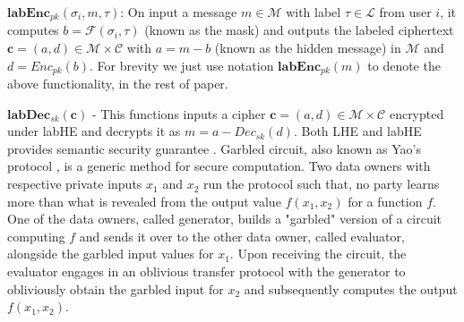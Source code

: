 \item $\textbf{labEnc}_{pk}(\sigma_i, m , \tau)$: On input a message $m \in \mathcal{M} $ with label $\tau \in \mathcal{L}$  from user $i$, it computes $b=\mathcal{F}(\sigma_i, \tau)$ (known as the mask) and outputs the labeled ciphertext $\mathbf{c}=(a,d) \in \mathcal{M} \times \mathcal{C}$ with $ a= m- b$  (known as the hidden message) in $\mathcal{M}$ and $d=Enc_{pk}(b)$. For brevity we just use notation $\textbf{labEnc}_{pk}(m)$ to denote the above functionality, in the rest of paper. 
\item $\textbf{labDec}_{sk}(\mathbf{c})$ - This functions inputs a cipher $\mathbf{c}=(a,d) \in \mathcal{M} \times \mathcal{C}$ encrypted under  \textsf{labHE} and decrypts it as $m=a-Dec_{sk}(d)$.\squishend
Both \textsf{LHE} and \textsf{labHE} provides semantic security guarantee \cite{Katz}.
Garbled circuit, also known as Yao's protocol \cite{Yao,Yao2},  is a generic method for secure computation. Two data owners with respective private inputs $x_1$ and $x_2$ run the protocol such that, no party learns more  
than what is revealed from the output value $f(x_1,x_2)$ for a function $f$.  One of the data owners, called
generator, builds a "garbled" version of a circuit computing $f$ and sends it over to the other data owner, called evaluator, alongside the garbled input values for $x_1$.  Upon receiving the circuit, the evaluator 
engages in an oblivious transfer protocol with the generator to obliviously obtain the garbled input for $x_2$ and subsequently computes the  output $f(x_1, x_2)$.
